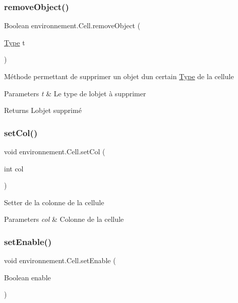 \subsubsection{\texorpdfstring{remove\+Object()}{removeObject()}}
{\footnotesize\ttfamily Boolean environnement.\+Cell.\+remove\+Object (\begin{DoxyParamCaption}\item[{\hyperlink{enumenvironnement_1_1_type}{Type}}]{t }\end{DoxyParamCaption})}

Méthode permettant de supprimer un objet d\textquotesingle{}un certain \hyperlink{}{Type} de la cellule 
\begin{DoxyParams}{Parameters}
{\em t} & Le type de l\textquotesingle{}objet à supprimer \\
\hline
\end{DoxyParams}
\begin{DoxyReturn}{Returns}
L\textquotesingle{}objet supprimé 
\end{DoxyReturn}
\hypertarget{classenvironnement_1_1_cell_a864f6711fd70a6fa132f8c2280db72af}{}\label{classenvironnement_1_1_cell_a864f6711fd70a6fa132f8c2280db72af} 
\subsubsection{\texorpdfstring{set\+Col()}{setCol()}}
{\footnotesize\ttfamily void environnement.\+Cell.\+set\+Col (\begin{DoxyParamCaption}\item[{int}]{col }\end{DoxyParamCaption})}

Setter de la colonne de la cellule 
\begin{DoxyParams}{Parameters}
{\em col} & Colonne de la cellule \\
\hline
\end{DoxyParams}
\hypertarget{classenvironnement_1_1_cell_a6581171e649b2eca5bf1ebfcdc106ed9}{}\label{classenvironnement_1_1_cell_a6581171e649b2eca5bf1ebfcdc106ed9} 
\subsubsection{\texorpdfstring{set\+Enable()}{setEnable()}}
{\footnotesize\ttfamily void environnement.\+Cell.\+set\+Enable (\begin{DoxyParamCaption}\item[{Boolean}]{enable }\end{DoxyParamCaption})}


